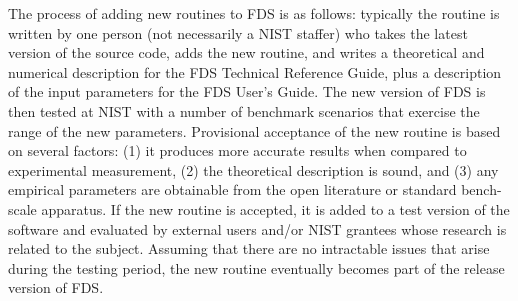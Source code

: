 \documentclass[11pt]{book}
\begin{document}
The process of adding new routines to FDS is as follows: typically the
routine is written by one person (not necessarily a NIST staffer) who
takes the latest version of the source code, adds the new routine, and
writes a theoretical and numerical description for the FDS Technical
Reference Guide, plus a description of the input parameters for the
FDS User's Guide. The new version of FDS is then tested at NIST with a
number of benchmark scenarios that exercise the range of the new
parameters.  Provisional acceptance of the new routine is based on
several factors: (1) it produces more accurate results when compared
to experimental measurement, (2) the theoretical description is sound,
and (3) any empirical parameters are obtainable from the open
literature or standard bench-scale apparatus.  If the new routine is
accepted, it is added to a test version of the software and evaluated
by external users and/or NIST grantees whose research is related to
the subject. Assuming that there are no intractable issues that arise
during the testing period, the new routine eventually becomes part of
the release version of FDS.
\end{document}
